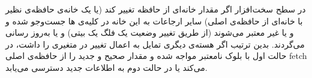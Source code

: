 در سطح سخت‌افزار اگر مقدار خانه‌ای از حافظه تغییر کند (یا یک خانه‌ی حافظه‌ی
نظیر با خانه‌ای از حافظه‌ی اصلی) سایر ارجاعات به این خانه در کلیه‌ی
ها 
جست‌وجو شده و و یا غیر معتبر می‌شوند (از طریق تغییر وضعیت یک فلگ یک بیتی) و یا به‌روز رسانی می‌گردند. بدین ترتیب اگر هسته‌ی دیگری تمایل به اعمال تغییر در متغیری را داشت، در حالت اول با بلوک نامعتبر مواجه شده و مقدار صحیح و جدید را از حافظه‌ی اصلی fetch می‌کند یا در حالت دوم به اطلاعات جدید دسترسی می‌یابد.